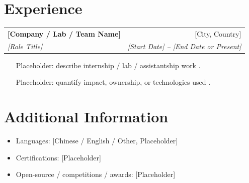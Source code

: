 \documentclass[11pt]{article}
\newcommand{\resumeSubheading}[4]{
  \begin{tabularx}{\textwidth}{Xr}
    \textbf{#1} & #2 \\
    \textit{#3} & \textit{#4} \\
  \end{tabularx}
}
\begin{document}
\section*{Experience}
\resumeSubheading
  {[Company / Lab / Team Name]}{[City, Country]}
  {[Role Title]}{[Start Date] -- [End Date or Present]}
\begin{itemize}
  \item [Placeholder: describe internship / lab / assistantship work].
  \item [Placeholder: quantify impact, ownership, or technologies used].
\end{itemize}

\section*{Additional Information}
\begin{itemize}
  \item Languages: [Chinese / English / Other, Placeholder]
  \item Certifications: [Placeholder]
  \item Open-source / competitions / awards: [Placeholder]
\end{itemize}
\end{document}
